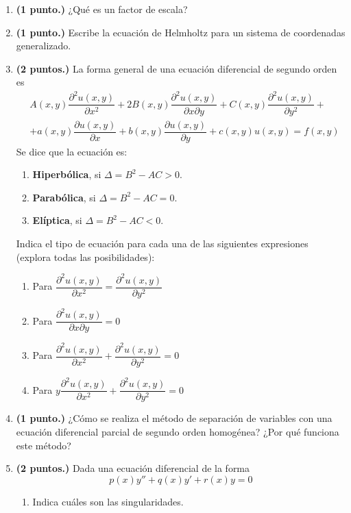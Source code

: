 \begin{enumerate}
\item \textbf{(1 punto.)} ¿Qué es un factor de escala?
\item \textbf{(1 punto.)} Escribe la ecuación de Helmholtz para un sistema de coordenadas generalizado.
\item \textbf{(2 puntos.)} La forma general de una ecuación diferencial de segundo orden es
\[ \begin{split} & A(x,y) \dfrac{\partial^{2} u(x,y)}{\partial x^{2}}  + 2B(x,y) \dfrac{\partial^{2} u(x,y)}{\partial x \partial y} + C(x,y) \dfrac{\partial^{2} u(x,y)}{\partial y^{2}} + \\
&+ a(x,y) \dfrac{\partial u(x,y)}{\partial x} + b(x,y) \dfrac{\partial u(x,y)}{\partial y} + c(x,y)u(x,y) = f(x,y) \end{split} \]
Se dice que la ecuación es:
\begin{enumerate} [label=\alph*)]
\item \textbf{Hiperbólica}, si $\Delta = B^{2} - AC > 0$.
\item \textbf{Parabólica}, si $\Delta = B^{2} - AC = 0$.
\item \textbf{Elíptica}, si $\Delta = B^{2} - AC < 0$.
\end{enumerate}
Indica el tipo de ecuación para cada una de las siguientes expresiones (explora todas las posibilidades):
\begin{enumerate}[label=\alph*)]
\item Para $ \dfrac{\partial^{2} u(x,y)}{\partial x^{2}} = \dfrac{\partial^{2} u(x,y)}{\partial y^{2}}$
\item Para $\dfrac{\partial^{2} u(x,y)}{\partial x \partial y} = 0$
\item Para $ \dfrac{\partial^{2} u(x,y)}{\partial x^{2}} + \dfrac{\partial^{2} u(x,y)}{\partial y^{2}} = 0$
\item Para $ y \dfrac{\partial^{2} u(x,y)}{\partial x^{2}} + \dfrac{\partial^{2} u(x,y)}{\partial y^{2}} = 0$
\end{enumerate}
\item \textbf{(1 punto.)} ¿Cómo se realiza el método de separación de variables con una ecuación diferencial parcial de segundo orden homogénea? ¿Por qué funciona este método?
\item \textbf{(2 puntos.)} Dada una ecuación diferencial de la forma
\[ p(x) y'' + q(x) y' + r(x) y = 0 \]
\begin{enumerate}[label=\alph*)]
\item Indica cuáles son las singularidades.

\end{enumerate}
\end{enumerate}
